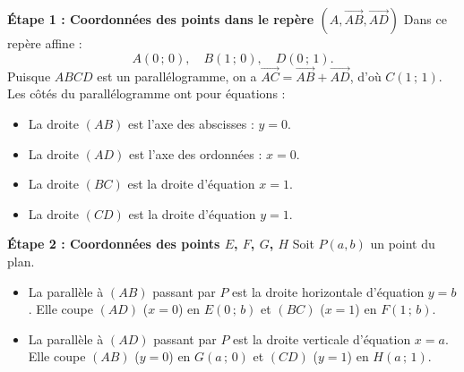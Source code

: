 \documentclass[11pt,a4paper]{article}
\newcommand{\vect}[1]{\overrightarrow{#1}}
\begin{document}
\begin{correctionbox}
\textbf{Étape 1 : Coordonnées des points dans le repère $(A, \vect{AB}, \vect{AD})$}
Dans ce repère affine :
\[
A(0\,;\,0), \quad B(1\,;\,0), \quad D(0\,;\,1).
\]
Puisque $ABCD$ est un parallélogramme, on a $\vect{AC} = \vect{AB} + \vect{AD}$, d'où $C(1\,;\,1)$.
Les côtés du parallélogramme ont pour équations :
\begin{itemize}[leftmargin=1cm]
    \item La droite $(AB)$ est l'axe des abscisses : $y = 0$.
    \item La droite $(AD)$ est l'axe des ordonnées : $x = 0$.
    \item La droite $(BC)$ est la droite d'équation $x = 1$.
    \item La droite $(CD)$ est la droite d'équation $y = 1$.
\end{itemize}

\textbf{Étape 2 : Coordonnées des points $E$, $F$, $G$, $H$}
Soit $P(a, b)$ un point du plan.
\begin{itemize}[leftmargin=1cm]
    \item La parallèle à $(AB)$ passant par $P$ est la droite horizontale d'équation $y = b$.
    Elle coupe $(AD)$ ($x = 0$) en $E(0\,;\,b)$ et $(BC)$ ($x = 1$) en $F(1\,;\,b)$.
    \item La parallèle à $(AD)$ passant par $P$ est la droite verticale d'équation $x = a$.
    Elle coupe $(AB)$ ($y = 0$) en $G(a\,;\,0)$ et $(CD)$ ($y = 1$) en $H(a\,;\,1)$.
\end{itemize}


\end{correctionbox}
\end{document}
